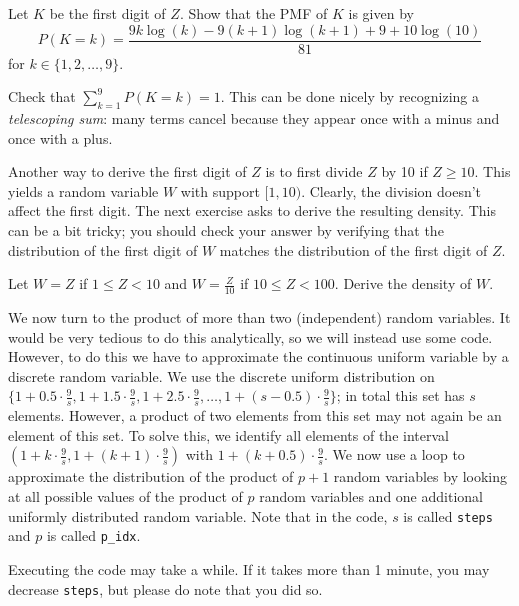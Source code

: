 \begin{exercise}
Let $K$ be the first digit of $Z$. Show that the PMF of $K$ is given by
$$P(K = k)  = \frac{9k\log(k) - 9(k+1)\log(k+1) + 9+ 10 \log(10)}{81}$$
for $k \in \{1, 2, \ldots, 9\}$.

\end{exercise}


\begin{exercise}
Check that $\sum_{k=1}^9 P(K = k) = 1$. This can be done nicely by recognizing a \textit{telescoping sum}: many terms cancel because they appear once with a minus and once with a plus.
\end{exercise}


Another way to derive the first digit of $Z$ is to first divide $Z$ by 10 if $Z \geq 10$. This yields a random variable $W$ with support $[1, 10)$. Clearly, the division doesn't affect the first digit.  The next exercise asks to derive the resulting density. This can be a bit tricky; you should check your answer by verifying that the distribution of the first digit of $W$ matches the distribution of the first digit of $Z$.

\begin{exercise}
Let $W = Z$ if $1 \leq Z < 10$ and $W = \tfrac{Z}{10}$ if $10 \leq Z < 100$. Derive the density of $W$.
\end{exercise}


We now turn to the product of more than two (independent) random variables. It would be very tedious to do this analytically, so we will instead use some code. However, to do this we have to approximate the continuous uniform variable by a discrete random variable. We use the discrete uniform distribution on $\{1+ 0.5 \cdot \frac{9}{s}, 1 + 1.5 \cdot \frac{9}{s}, 1 + 2.5 \cdot \frac{9}{s}, \ldots, 1 + (s-0.5) \cdot \frac{9}{s}\}$; in total this set has $s$ elements. However, a product of two elements from this set may not again be an element of this set. To solve this, we identify all elements of the interval $\left(1+ k \cdot \frac{9}{s}, 1+ (k+1)\cdot \frac{9}{s}\right)$ with $1+ (k+0.5)\cdot \frac{9}{s}$. We now use a loop to approximate the distribution of the product of $p+1$ random variables by looking at  all possible values of the product of $p$ random variables and one additional uniformly distributed random variable. Note that in the code, $s$ is called \texttt{steps} and $p$ is  called \verb|p_idx|.

Executing the code may take a while. If it takes more than 1 minute, you may decrease \texttt{steps}, but please do note that you did so.

